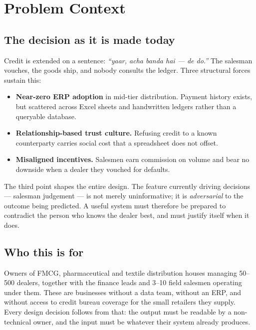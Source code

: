 \documentclass[11pt,a4paper]{article}
\begin{document}
\section{Problem Context}

\subsection{The decision as it is made today}

Credit is extended on a sentence: \emph{``yaar, acha banda hai --- de do.''}
The salesman vouches, the goods ship, and nobody consults the ledger. Three
structural forces sustain this:

\begin{itemize}[leftmargin=1.3em,itemsep=2pt,topsep=3pt]
  \item \textbf{Near-zero ERP adoption} in mid-tier distribution. Payment
        history exists, but scattered across Excel sheets and handwritten
        ledgers rather than a queryable database.
  \item \textbf{Relationship-based trust culture.} Refusing credit to a known
        counterparty carries social cost that a spreadsheet does not offset.
  \item \textbf{Misaligned incentives.} Salesmen earn commission on volume and
        bear no downside when a dealer they vouched for defaults.
\end{itemize}

The third point shapes the entire design. The feature currently driving
decisions --- salesman judgement --- is not merely uninformative; it is
\emph{adversarial} to the outcome being predicted. A useful system must
therefore be prepared to contradict the person who knows the dealer best, and
must justify itself when it does.

\subsection{Who this is for}

Owners of FMCG, pharmaceutical and textile distribution houses managing 50--500
dealers, together with the finance leads and 3--10 field salesmen operating
under them. These are businesses without a data team, without an ERP, and
without access to credit bureau coverage for the small retailers they supply.
Every design decision follows from that: the output must be readable by a
non-technical owner, and the input must be whatever their system already
produces.
\end{document}
